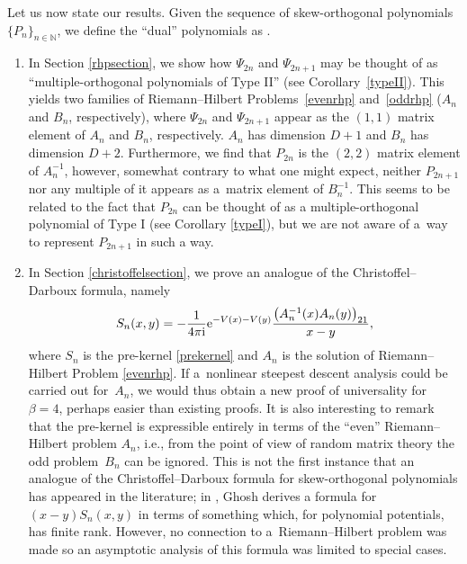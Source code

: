 \documentclass[pdftex]{sigma}
\numberwithin{equation}{section}
\begin{document}
Let us now state our results. Given the sequence of skew-orthogonal polynomials $\{ P_n \}_{n \in \mathbb{N}}$, we define the \enquote{dual} polynomials as .
\begin{enumerate}\itemsep=0pt
\item[(1)] In Section \ref{rhpsection}, we show how $\Psi_{2n}$ and $\Psi_{2n+1}$ may be thought of as \enquote{multiple-orthogonal polynomials of Type II} (see Corollary~\ref{typeII}). This yields two families of Riemann--Hilbert Problems~\ref{evenrhp} and~\ref{oddrhp} ($A_n$ and $B_n$, respectively), where $\Psi_{2n}$ and $\Psi_{2n+1}$ appear as the $(1,1)$ matrix element of $A_n$ and $B_n$, respectively. $A_n$ has dimension $D+1$ and $B_n$ has dimension $D+2$. Furthermore, we find that $P_{2n}$ is the $(2,2)$ matrix element of $A_n^{-1}$, however, somewhat contrary to what one might expect, neither $P_{2n+1}$ nor any multiple of it appears as a~matrix element of $B_n^{-1}$. This seems to be related to the fact that $P_{2n}$ can be thought of as a multiple-orthogonal polynomial of Type I (see Corollary \ref{typeI}), but we are not aware of a~way to represent $P_{2n+1}$ in such a way.
\item[(2)] In Section \ref{christoffelsection}, we prove an analogue of the Christoffel--Darboux formula, namely
\begin{equation}\label{christoffel}
S_n(x,y) = - \frac{1}{4\pi {\rm i}} {\rm e}^{-V(x) - V(y)} \frac{\big( A_n^{-1}(x) A_n(y) \big)_{21}}{x-y} ,
\end{equation}
where $S_n$ is the pre-kernel \eqref{prekernel} and $A_n$ is the solution of Riemann--Hilbert Problem \ref{evenrhp}. If a~nonlinear steepest descent analysis could be carried out for~$A_n$, we would thus obtain a new proof of universality for $\beta = 4$, perhaps easier than existing proofs. It is also interesting to remark that the pre-kernel is expressible entirely in terms of the \enquote{even} Riemann--Hilbert problem $A_n$, i.e., from the point of view of random matrix theory the odd problem~$B_n$ can be ignored. This is not the first instance that an analogue of the Christoffel--Darboux formula for skew-orthogonal polynomials has appeared in the literature; in \cite{Ghosh_2006}, Ghosh derives a formula for $(x-y)S_n(x,y)$ in terms of something which, for polynomial potentials, has finite rank. However, no connection to a~Riemann--Hilbert problem was made so an asymptotic analysis of this formula was limited to special cases.

\end{enumerate}
\end{document}
